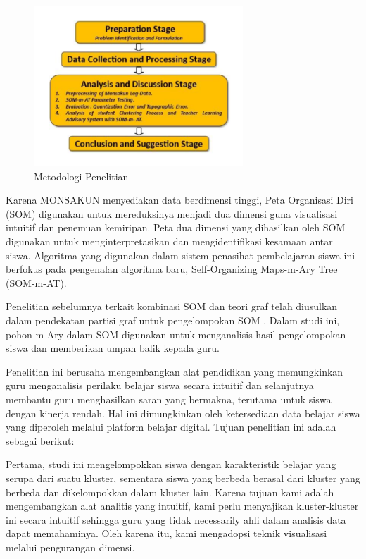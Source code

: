     \begin{figure}[H]
        \centering
        \includegraphics[width=0.7\textwidth]{Gambar/gambar6.1.png}
        \caption{Metodologi Penelitian}
    \end{figure}

    Karena MONSAKUN menyediakan data berdimensi tinggi, Peta Organisasi Diri (SOM) digunakan untuk mereduksinya menjadi dua dimensi \citep{Kohonen2002} guna visualisasi intuitif dan penemuan kemiripan. Peta dua dimensi yang dihasilkan oleh SOM digunakan untuk menginterpretasikan dan mengidentifikasi kesamaan antar siswa. Algoritma yang digunakan dalam sistem penasihat pembelajaran siswa ini berfokus pada pengenalan algoritma baru, Self-Organizing Maps-m-Ary Tree (SOM-m-AT).

    Penelitian sebelumnya terkait kombinasi SOM dan teori graf telah diusulkan dalam pendekatan partisi graf untuk pengelompokan SOM \citep{Silva2011}. Dalam studi ini, pohon m-Ary dalam SOM digunakan untuk menganalisis hasil pengelompokan siswa dan memberikan umpan balik kepada guru.
    
    Penelitian ini berusaha mengembangkan alat pendidikan yang memungkinkan guru menganalisis perilaku belajar siswa secara intuitif dan selanjutnya membantu guru menghasilkan saran yang bermakna, terutama untuk siswa dengan kinerja rendah. Hal ini dimungkinkan oleh ketersediaan data belajar siswa yang diperoleh melalui platform belajar digital. Tujuan penelitian ini adalah sebagai berikut:
    
    Pertama, studi ini mengelompokkan siswa dengan karakteristik belajar yang serupa dari suatu kluster, sementara siswa yang berbeda berasal dari kluster yang berbeda dan dikelompokkan dalam kluster lain. Karena tujuan kami adalah mengembangkan alat analitis yang intuitif, kami perlu menyajikan kluster-kluster ini secara intuitif sehingga guru yang tidak necessarily ahli dalam analisis data dapat memahaminya. Oleh karena itu, kami mengadopsi teknik visualisasi melalui pengurangan dimensi.
    
